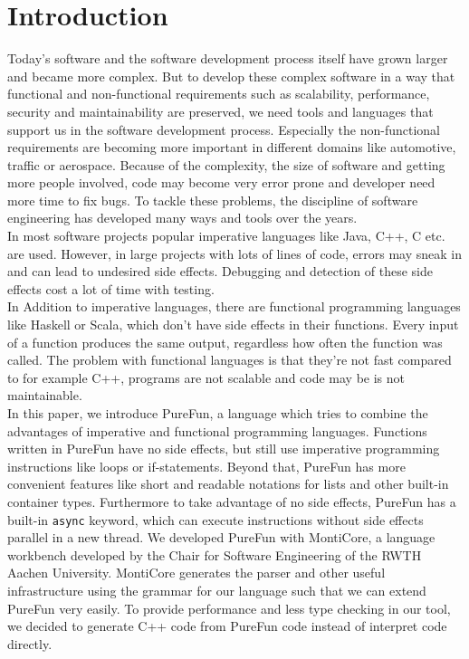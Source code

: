 \section{Introduction}


Today's software and the software development process itself have grown larger and became more complex. But to develop these complex software in a way that functional and non-functional requirements such as scalability, performance, security and maintainability are preserved, we need tools and languages that support us in the software development process.  Especially the non-functional requirements are becoming more important in different domains like automotive, traffic or aerospace. Because of the complexity, the size of software and getting more people involved, code may become very error prone and developer need more time to fix bugs. To tackle these problems, the discipline of software engineering has developed many ways and tools over the years.\\
In most software projects popular imperative languages like Java, C++, C etc. are used. However, in large projects with lots of lines of code, errors may sneak in and can lead to undesired side effects. Debugging and detection of these side effects cost a lot of time with testing.\\
In Addition to imperative languages, there are functional programming languages like Haskell or Scala, which don't have side effects in their functions. Every input of a function produces the same output, regardless how often the function was called. The problem with functional languages is that they're not fast compared to for example C++, programs are not scalable and code may be is not maintainable.\\
In this paper, we introduce PureFun, a language which tries to combine the advantages of imperative and functional programming languages. Functions written in PureFun have no side effects, but still use imperative programming instructions like loops or if-statements. Beyond that, PureFun has more convenient features like short and readable notations for lists and other built-in container types. Furthermore to take advantage of no side effects, PureFun has a built-in \lstinline{async}{} keyword, which can execute instructions without side effects parallel in a new thread. We developed PureFun with MontiCore, a language workbench developed by the Chair for Software Engineering of the RWTH Aachen University. MontiCore generates the parser and other useful infrastructure using the grammar for our language such that we can extend PureFun very easily. To provide performance and less type checking in our tool, we decided to generate C++ code from PureFun code instead of interpret code directly.\\
